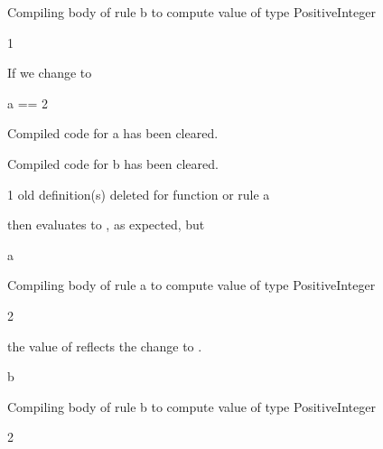 {\begin{xtc}
\begin{MessageOutput}
   Compiling body of rule b to compute value of type PositiveInteger 
\end{MessageOutput}
\begin{TeXOutput}
\begin{fricasmath}{8}
1%
\end{fricasmath}
\end{TeXOutput}
\end{xtc}
\begin{xtc}
\begin{xtccomment}
If we change  to 
\end{xtccomment}
\begin{spadsrc}
a == 2 
\end{spadsrc}
\begin{MessageOutput}
   Compiled code for a has been cleared.
\end{MessageOutput}
\begin{MessageOutput}
   Compiled code for b has been cleared.
\end{MessageOutput}
\begin{MessageOutput}
   1 old definition(s) deleted for function or rule a 
\end{MessageOutput}
\end{xtc}
\begin{xtc}
\begin{xtccomment}
then
 evaluates to , as expected, but
\end{xtccomment}
\begin{spadsrc}
a 
\end{spadsrc}
\begin{MessageOutput}
   Compiling body of rule a to compute value of type PositiveInteger 
\end{MessageOutput}
\begin{TeXOutput}
\begin{fricasmath}{10}
2%
\end{fricasmath}
\end{TeXOutput}
\end{xtc}
\begin{xtc}
\begin{xtccomment}
the value of  reflects the change to .
\end{xtccomment}
\begin{spadsrc}
b 
\end{spadsrc}
\begin{MessageOutput}
   Compiling body of rule b to compute value of type PositiveInteger 
\end{MessageOutput}
\begin{TeXOutput}
\begin{fricasmath}{11}
2%
\end{fricasmath}
\end{TeXOutput}
\end{xtc}

}
